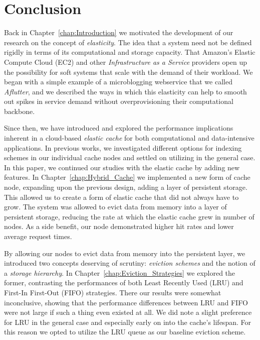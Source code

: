 \section{Conclusion} %
\label{sec:conclusion}
Back in Chapter~\ref{chap:Introduction} we motivated the development of our
research on the concept of \emph{elasticity}. The idea that a system need not
be defined rigidly in terms of its computational and storage capacity.  That
Amazon's Elastic Compute Cloud (EC2) and other \emph{Infrastructure as a
Service} providers open up the possibility for soft systems that scale with the
demand of their workload. We began with a simple example of a microblogging
webservice that we called \emph{Aflutter}, and we described the ways in which
this elasticity can help to smooth out spikes in service demand without
overprovisioning their computational backbone.

Since then, we have introduced and explored the performance implications
inherent in a cloud-based \emph{elastic cache} for both computational and
data-intensive applications. In previous
works\cite{chiu_ccgrid11,chiu_ijngc11}, we investigated different options for
indexing schemes in our individual cache nodes and settled on utilizing
\bptrees in the general case. In this paper, we continued our studies with the
elastic cache by adding new features. In Chapter~\ref{chap:Hybrid_Cache} we
implemented a new form of cache node, expanding upon the previous design,
adding a layer of persistent storage. This allowed us to create a form of
elastic cache that did not always have to grow. The system was allowed to evict
data from memory into a layer of persistent storage, reducing the rate at which
the elastic cache grew in number of nodes. As a side benefit, our node
demonstrated higher hit rates and lower average request times.

By allowing our nodes to evict data from memory into the persistent layer, we
introduced two concepts deserving of scrutiny: \emph{eviction schemes} and the
notion of a \emph{storage hierarchy}. In Chapter~\ref{chap:Eviction_Strategies}
we explored the former, contrasting the performances of both Least Recently
Used (LRU) and First-In First-Out (FIFO) strategies. There our results were
somewhat inconclusive, showing that the performance differences between LRU and
FIFO were not large if such a thing even existed at all. We did note a slight
preference for LRU in the general case and especially early on into the cache's
lifespan. For this reason we opted to utilize the LRU queue as our baseline
eviction scheme.

